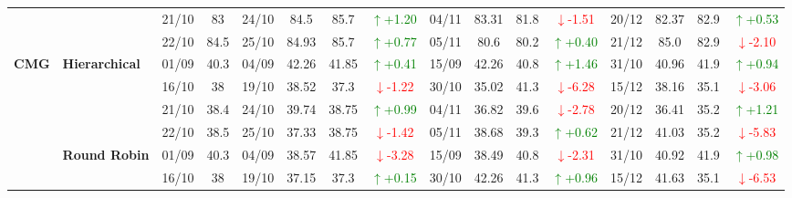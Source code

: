 \documentclass{ieeeaccess}
\begin{document}
{\begin{longtable}{llcc|cccc|cccc|cccc}
&
& 21/10 & 83 & 24/10 & 84.5 & 85.7 & \textcolor{green}{\(\uparrow\)+1.20} & 04/11 & 83.31 & 81.8 & \textcolor{red}{\(\downarrow\)-1.51} & 20/12 & 82.37 & 82.9 & \textcolor{green}{\(\uparrow\)+0.53} \\

&
& 22/10 & 84.5 & 25/10 & 84.93 & 85.7 & \textcolor{green}{\(\uparrow\)+0.77} & 05/11 & 80.6 & 80.2 & \textcolor{green}{\(\uparrow\)+0.40} & 21/12 & 85.0 & 82.9 & \textcolor{red}{\(\downarrow\)-2.10} \\




\midrule


\multirow{12}{*}{\textbf{CMG}} 
& \textbf{Hierarchical}
& 01/09 & 40.3 & 04/09 & 42.26 & 41.85 & \textcolor{green}{\(\uparrow\)+0.41} & 15/09 & 42.26 & 40.8 & \textcolor{green}{\(\uparrow\)+1.46} & 31/10 & 40.96 & 41.9 & \textcolor{green}{\(\uparrow\)+0.94} \\

& 
& 16/10 & 38 & 19/10 & 38.52 & 37.3 & \textcolor{red}{\(\downarrow\)-1.22} & 30/10 & 35.02 & 41.3 & \textcolor{red}{\(\downarrow\)-6.28} & 15/12 & 38.16 & 35.1 & \textcolor{red}{\(\downarrow\)-3.06} \\

& 
& 21/10 & 38.4 & 24/10 & 39.74 & 38.75 & \textcolor{green}{\(\uparrow\)+0.99} & 04/11 & 36.82 & 39.6 & \textcolor{red}{\(\downarrow\)-2.78} & 20/12 & 36.41 & 35.2 & \textcolor{green}{\(\uparrow\)+1.21} \\

&
& 22/10 & 38.5 & 25/10 & 37.33 & 38.75 & \textcolor{red}{\(\downarrow\)-1.42} & 05/11 & 38.68 & 39.3 & \textcolor{green}{\(\uparrow\)+0.62} & 21/12 & 41.03 & 35.2 & \textcolor{red}{\(\downarrow\)-5.83} \\
\cmidrule(lr){2-16}


& \textbf{Round Robin}
& 01/09 & 40.3 & 04/09 & 38.57 & 41.85 & \textcolor{red}{\(\downarrow\)-3.28} & 15/09 & 38.49 & 40.8 & \textcolor{red}{\(\downarrow\)-2.31} & 31/10 & 40.92 & 41.9 & \textcolor{green}{\(\uparrow\)+0.98} \\

& 
& 16/10 & 38 & 19/10 & 37.15 & 37.3 & \textcolor{green}{\(\uparrow\)+0.15} & 30/10 & 42.26 & 41.3 & \textcolor{green}{\(\uparrow\)+0.96} & 15/12 & 41.63 & 35.1 & \textcolor{red}{\(\downarrow\)-6.53} \\


\end{longtable}}
\end{document}

